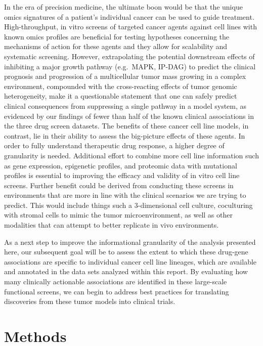 \documentclass[man,floatsintext]{apa6}
\begin{document}
In the era of precision medicine, the ultimate boon would be that the
unique omics signatures of a patient's individual cancer can be used to
guide treatment. High-throughput, in vitro screens of targeted cancer
agents against cell lines with known omics profiles are beneficial for
testing hypotheses concerning the mechanisms of action for these agents
and they allow for scalability and systematic screening. However,
extrapolating the potential downstream effects of inhibiting a major
growth pathway (e.g.~MAPK, IP-DAG) to predict the clinical prognosis and
progression of a multicellular tumor mass growing in a complex
environment, compounded with the cross-reacting effects of tumor genomic
heterogeneity, make it a questionable statement that one can safely
predict clinical consequences from suppressing a single pathway in a
model system, as evidenced by our findings of fewer than half of the
known clinical associations in the three drug screen datasets. The
benefits of these cancer cell line models, in contrast, lie in their
ability to assess the big-picture effects of these agents. In order to
fully understand therapeutic drug response, a higher degree of
granularity is needed. Additional effort to combine more cell line
information such as gene expression, epigenetic profiles, and proteomic
data with mutational profiles is essential to improving the efficacy and
validity of in vitro cell line screens. Further benefit could be derived
from conducting these screens in environments that are more in line with
the clinical scenarios we are trying to predict. This would include
things such a 3-dimensional cell culture, coculturing with stromal cells
to mimic the tumor microenvironment, as well as other modalities that
can attempt to better replicate in vivo environments.

As a next step to improve the informational granularity of the analysis
presented here, our subsequent goal will be to assess the extent to
which these drug-gene associations are specific to individual cancer
cell line lineages, which are available and annotated in the data sets
analyzed within this report. By evaluating how many clinically
actionable associations are identified in these large-scale functional
screens, we can begin to address best practices for translating
discoveries from these tumor models into clinical trials.

\newpage

\section{Methods}\label{methods}
\end{document}
